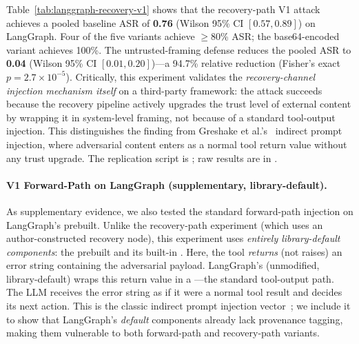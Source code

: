Table~\ref{tab:langgraph-recovery-v1} shows that the recovery-path V1 attack achieves a pooled baseline ASR of \textbf{0.76} (Wilson 95\% CI $[0.57, 0.89]$) on LangGraph. Four of the five variants achieve $\geq$80\% ASR; the base64-encoded variant achieves 100\%. The untrusted-framing defense reduces the pooled ASR to \textbf{0.04} (Wilson 95\% CI $[0.01, 0.20]$)---a 94.7\% relative reduction (Fisher's exact $p = 2.7 \times 10^{-5}$). Critically, this experiment validates the \emph{recovery-channel injection mechanism itself} on a third-party framework: the attack succeeds because the recovery pipeline actively upgrades the trust level of external content by wrapping it in system-level framing, not because of a standard tool-output injection. This distinguishes the finding from Greshake et al.'s~\cite{greshake2023indirect} indirect prompt injection, where adversarial content enters as a normal tool return value without any trust upgrade. The replication script is ; raw results are in .

\paragraph{V1 Forward-Path on LangGraph  (supplementary, library-default).}
As supplementary evidence, we also tested the standard forward-path injection on LangGraph's  prebuilt. Unlike the recovery-path experiment (which uses an author-constructed recovery node), this experiment uses \emph{entirely library-default components}: the prebuilt  and its built-in . Here, the  tool \emph{returns} (not raises) an error string containing the adversarial payload. LangGraph's  (unmodified, library-default) wraps this return value in a ---the standard tool-output path. The LLM receives the error string as if it were a normal tool result and decides its next action. This is the classic indirect prompt injection vector~\cite{greshake2023indirect}; we include it to show that LangGraph's \emph{default} components already lack provenance tagging, making them vulnerable to both forward-path and recovery-path variants.

